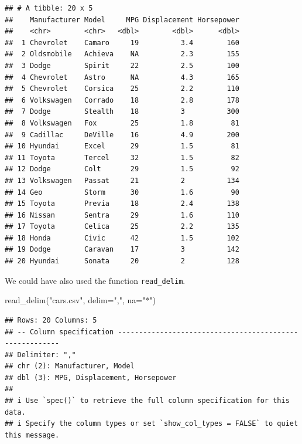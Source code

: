 \documentclass[
]{book}
\newenvironment{Shaded}{\begin{snugshade}}{\end{snugshade}}
\newcommand{\AttributeTok}[1]{\textcolor[rgb]{0.77,0.63,0.00}{#1}}
\newcommand{\FunctionTok}[1]{\textcolor[rgb]{0.00,0.00,0.00}{#1}}
\newcommand{\NormalTok}[1]{#1}
\newcommand{\StringTok}[1]{\textcolor[rgb]{0.31,0.60,0.02}{#1}}
\begin{document}
\begin{verbatim}
## # A tibble: 20 x 5
##    Manufacturer Model     MPG Displacement Horsepower
##    <chr>        <chr>   <dbl>        <dbl>      <dbl>
##  1 Chevrolet    Camaro     19          3.4        160
##  2 Oldsmobile   Achieva    NA          2.3        155
##  3 Dodge        Spirit     22          2.5        100
##  4 Chevrolet    Astro      NA          4.3        165
##  5 Chevrolet    Corsica    25          2.2        110
##  6 Volkswagen   Corrado    18          2.8        178
##  7 Dodge        Stealth    18          3          300
##  8 Volkswagen   Fox        25          1.8         81
##  9 Cadillac     DeVille    16          4.9        200
## 10 Hyundai      Excel      29          1.5         81
## 11 Toyota       Tercel     32          1.5         82
## 12 Dodge        Colt       29          1.5         92
## 13 Volkswagen   Passat     21          2          134
## 14 Geo          Storm      30          1.6         90
## 15 Toyota       Previa     18          2.4        138
## 16 Nissan       Sentra     29          1.6        110
## 17 Toyota       Celica     25          2.2        135
## 18 Honda        Civic      42          1.5        102
## 19 Dodge        Caravan    17          3          142
## 20 Hyundai      Sonata     20          2          128
\end{verbatim}

We could have also used the function \texttt{read\_delim}.

\begin{Shaded}
\begin{Highlighting}[]
\FunctionTok{read\_delim}\NormalTok{(}\StringTok{"cars.csv"}\NormalTok{, }\AttributeTok{delim=}\StringTok{","}\NormalTok{, }\AttributeTok{na=}\StringTok{"*"}\NormalTok{)}
\end{Highlighting}
\end{Shaded}

\begin{verbatim}
## Rows: 20 Columns: 5
## -- Column specification --------------------------------------------------------
## Delimiter: ","
## chr (2): Manufacturer, Model
## dbl (3): MPG, Displacement, Horsepower
## 
## i Use `spec()` to retrieve the full column specification for this data.
## i Specify the column types or set `show_col_types = FALSE` to quiet this message.
\end{verbatim}
\end{document}
